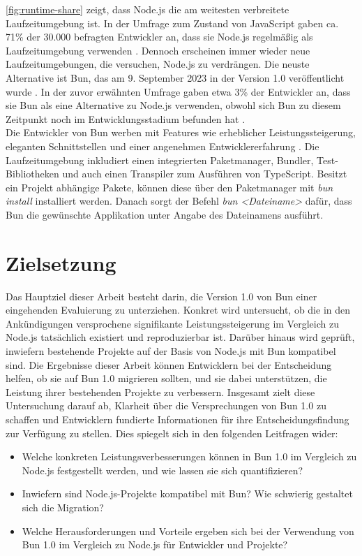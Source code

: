 \noindent
\autoref{fig:runtime-share} zeigt, dass Node.js die am weitesten verbreitete Laufzeitumgebung ist. In der Umfrage zum Zustand von JavaScript gaben ca. 71\% der 30.000 befragten Entwickler an, dass sie Node.js regelmäßig als Laufzeitumgebung verwenden \cite{Greif.2022}. Dennoch erscheinen immer wieder neue Laufzeitumgebungen, die versuchen, Node.js zu verdrängen. Die neuste Alternative ist Bun, das am 9. September 2023 in der Version 1.0 veröffentlicht wurde \cite{Sumner.2023c}. In der zuvor erwähnten Umfrage gaben etwa 3\% der Entwickler an, dass sie Bun als eine Alternative zu Node.js verwenden, obwohl sich Bun zu diesem Zeitpunkt noch im Entwicklungsstadium befunden hat \cite{Greif.2022}.\\

\noindent
Die Entwickler von Bun werben mit Features wie erheblicher Leistungssteigerung, eleganten Schnittstellen und einer angenehmen Entwicklererfahrung \cite{OvenSh.2023b}. Die Laufzeitumgebung inkludiert einen integrierten Paketmanager, Bundler, Test-Bibliotheken und auch einen Transpiler zum Ausführen von TypeScript. Besitzt ein Projekt abhängige Pakete, können diese über den Paketmanager mit \textit{bun install} installiert werden. Danach sorgt der Befehl \textit{bun <Dateiname>} dafür, dass Bun die gewünschte Applikation unter Angabe des Dateinamens ausführt.\cite{Sumner.2023c}

\section{Zielsetzung} \label{sec:introduction-target}
Das Hauptziel dieser Arbeit besteht darin, die Version 1.0 von Bun einer eingehenden Evaluierung zu unterziehen. Konkret wird untersucht, ob die in den Ankündigungen versprochene signifikante Leistungssteigerung im Vergleich zu Node.js tatsächlich existiert und reproduzierbar ist. Darüber hinaus wird geprüft, inwiefern bestehende Projekte auf der Basis von Node.js mit Bun kompatibel sind. Die Ergebnisse dieser Arbeit können Entwicklern bei der Entscheidung helfen, ob sie auf Bun 1.0 migrieren sollten, und sie dabei unterstützen, die Leistung ihrer bestehenden Projekte zu verbessern. Insgesamt zielt diese Untersuchung darauf ab, Klarheit über die Versprechungen von Bun 1.0 zu schaffen und Entwicklern fundierte Informationen für ihre Entscheidungsfindung zur Verfügung zu stellen. Dies spiegelt sich in den folgenden Leitfragen wider:
\begin{itemize}
    \item Welche konkreten Leistungsverbesserungen können in Bun 1.0 im Vergleich zu Node.js festgestellt werden, und wie lassen sie sich quantifizieren?
    \item Inwiefern sind Node.js-Projekte kompatibel mit Bun? Wie schwierig gestaltet sich die Migration?
    \item Welche Herausforderungen und Vorteile ergeben sich bei der Verwendung von Bun 1.0 im Vergleich zu Node.js für Entwickler und Projekte?
\end{itemize}

